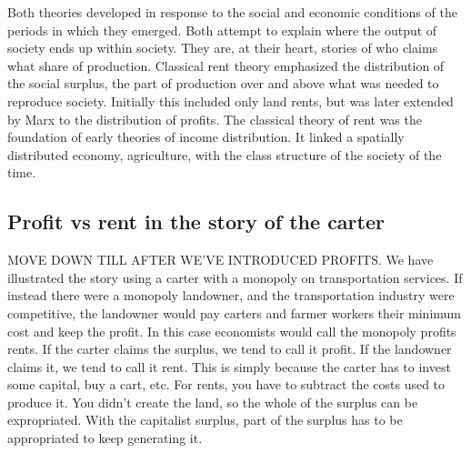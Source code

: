 Both theories developed in response to the social and economic conditions of the periods in which they emerged. Both attempt to explain where the output of society ends up within society. They are, at their heart, stories of who %
claims what share of production. Classical rent theory emphasized the distribution of the social \gls{surplus}, the part of production over and above what was needed to reproduce society. Initially this included only land rents, but was later extended by Marx to the distribution of profits.
The classical theory of rent was the foundation of early %
theories of income distribution. It linked a spatially distributed economy, agriculture, with the class structure of the society of the time. 

\subsection{Profit vs rent in the story of the carter}
MOVE DOWN TILL AFTER WE'VE INTRODUCED PROFITS.
We have illustrated the story using a carter with a monopoly on transportation services. If instead there were a monopoly landowner, and the transportation industry were competitive, the landowner would pay carters and farmer workers their minimum cost and keep the profit. In this case economists would call the monopoly profits \glspl{rent}. If the carter claims the surplus, we tend to call it \gls{profit}. If the landowner claims it, we tend to call it \gls{rent}. This is simply because the carter has to invest some capital, buy a cart, etc. For rents, you have to subtract the costs used to produce it. You didn't create the land, so the whole of the surplus can be expropriated. With the capitalist surplus, part of the surplus has to be appropriated to keep generating it. %
